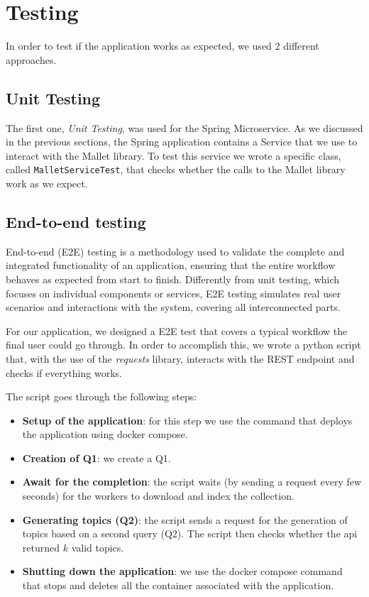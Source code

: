 \section{Testing}
In order to test if the application works as expected, we used 2 different
approaches.

\subsection{Unit Testing}
The first one, \textit{Unit Testing}, was used for the Spring Microservice.
As we discussed in the previous sections, the Spring application contains
a Service that we use to interact with the Mallet library. To test this service
we wrote a specific class, called \texttt{MalletServiceTest}, that checks whether
the calls to the Mallet library work as we expect.

\subsection{End-to-end testing}
End-to-end (E2E) testing is a methodology used to validate the complete and
integrated functionality of an application, ensuring that the entire workflow
behaves as expected from start to finish.
Differently from unit testing, which focuses on individual components or
services, E2E testing simulates real user scenarios and interactions with the
system, covering all interconnected parts.

For our application, we designed a E2E test that covers a typical workflow
the final user could go through.
In order to accomplish this, we wrote a python script that, with the use of
the \textit{requests} library, interacts with the REST endpoint and checks
if everything works.

The script goes through the following steps:
\begin{itemize}
        \item \textbf{Setup of the application}: for this step we use the
                command that deploys the application using docker compose.
        \item \textbf{Creation of Q1}: we create a Q1.
        \item \textbf{Await for the completion}: the script waits (by sending
                a request every few seconds) for the workers to download and
                index the collection.
        \item \textbf{Generating topics (Q2)}: the script sends a request for
                the generation of topics based on a second query (Q2). The script
                then checks whether the api returned $k$ valid topics.
        \item \textbf{Shutting down the application}: we use the docker
                compose command that stops and deletes all the container associated
                with the application.
\end{itemize}
